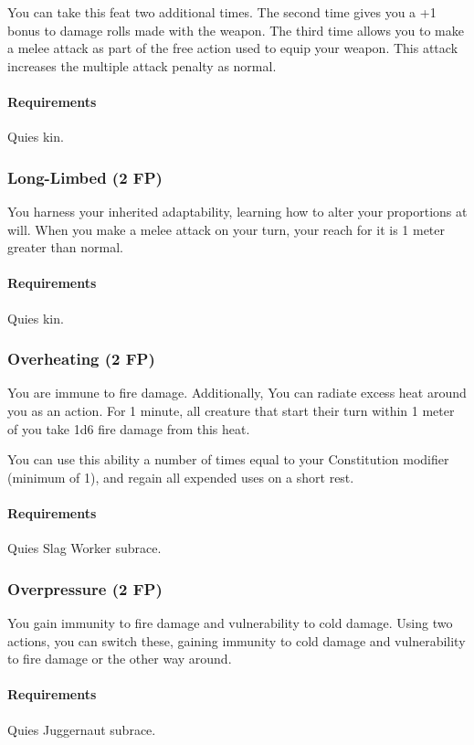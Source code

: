         You can take this feat two additional times.
        The second time gives you a +1 bonus to damage rolls made with the weapon.
        The third time allows you to make a melee attack as part of the free action used to equip your weapon.
        This attack increases the multiple attack penalty as normal.
        \paragraph{Requirements} Quies kin.
    \subsubsection{Long-Limbed (2 FP)} \label{feat::longlimbed}
        You harness your inherited adaptability, learning how to alter your proportions at will.
        When you make a melee attack on your turn, your reach for it is 1 meter greater than normal.
        \paragraph{Requirements} Quies kin.
    \subsubsection{Overheating (2 FP)} \label{feat::overheating}
        You are immune to fire damage.
        Additionally, You can radiate excess heat around you as an action.
        For 1 minute, all creature that start their turn within 1 meter of you take 1d6 fire damage from this heat.

        You can use this ability a number of times equal to your Constitution modifier (minimum of 1), and regain all expended uses on a short rest.
        \paragraph{Requirements} Quies Slag Worker subrace.
    \subsubsection{Overpressure (2 FP)} \label{feat::overpressure}
        You gain immunity to fire damage and vulnerability to cold damage.
        Using two actions, you can switch these, gaining immunity to cold damage and vulnerability to fire damage or the other way around.
        \paragraph{Requirements} Quies Juggernaut subrace.
